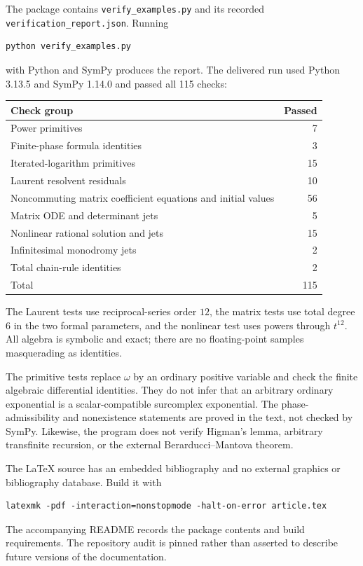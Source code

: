 \documentclass[11pt,letterpaper]{article}
\numberwithin{equation}{section}
\theoremstyle{definition}
\theoremstyle{remark}
\begin{document}
The package contains \texttt{verify\_examples.py} and its recorded
\texttt{verification\_report.json}. Running
\begin{lstlisting}
python verify_examples.py
\end{lstlisting}
with Python and SymPy produces the report. The delivered run used Python
3.13.5 and SymPy 1.14.0 and passed all 115 checks:
\begin{center}\small
\begin{tabularx}{0.94\textwidth}{@{}Yr@{}}
\toprule
Check group & Passed\\
\midrule
Power primitives & 7\\
Finite-phase formula identities & 3\\
Iterated-logarithm primitives & 15\\
Laurent resolvent residuals & 10\\
Noncommuting matrix coefficient equations and initial values & 56\\
Matrix ODE and determinant jets & 5\\
Nonlinear rational solution and jets & 15\\
Infinitesimal monodromy jets & 2\\
Total chain-rule identities & 2\\
\midrule
Total & 115\\
\bottomrule
\end{tabularx}
\end{center}

The Laurent tests use reciprocal-series order $12$, the matrix tests use
total degree $6$ in the two formal parameters, and the nonlinear test uses
powers through $t^{12}$. All algebra is symbolic and exact; there are no
floating-point samples masquerading as identities.

The primitive tests replace $\omega$ by an ordinary positive variable and
check the finite algebraic differential identities. They do not infer
that an arbitrary ordinary exponential is a scalar-compatible surcomplex
exponential. The phase-admissibility and nonexistence statements are proved
in the text, not checked by SymPy. Likewise, the program does not verify
Higman's lemma, arbitrary transfinite recursion, or the external
Berarducci--Mantova theorem.

The LaTeX source has an embedded bibliography and no external graphics or
bibliography database. Build it with
\begin{lstlisting}
latexmk -pdf -interaction=nonstopmode -halt-on-error article.tex
\end{lstlisting}
The accompanying README records the package contents and build requirements.
The repository audit is pinned rather than asserted to describe future
versions of the documentation.
\end{document}
